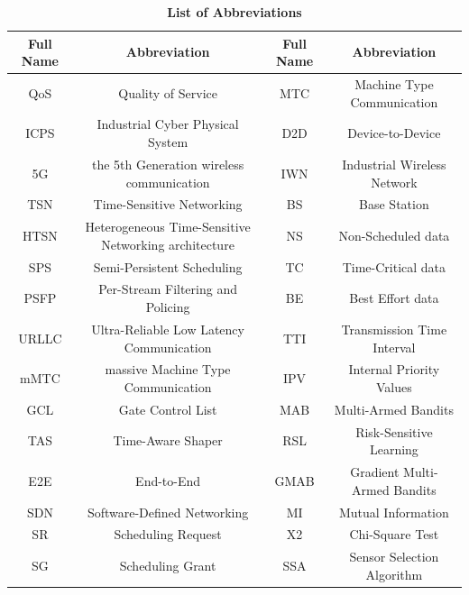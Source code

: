 \documentclass{SCIS2021}
\begin{document}
	
	\begin{table}[htbp]
		\footnotesize
		\captionsetup{labelformat=empty}
		\caption{{\color{blue}\textbf{List of Abbreviations}}}
		\label{tal:abbreviation}
		\label{tab0}
		\tabcolsep 8pt %
		\begin{tabular*}{\textwidth}{c|c|c|c}
			\toprule
			{\color{blue}\textbf{Full Name}} & {\color{blue}\textbf{Abbreviation}} & {\color{blue}\textbf{Full Name}} & {\color{blue}\textbf{Abbreviation}} \\\hline
			{\color{blue}QoS} & {\color{blue}Quality of Service} & {\color{blue}MTC} & {\color{blue}Machine Type Communication} \\
			{\color{blue}ICPS} & {\color{blue}Industrial Cyber Physical System} & {\color{blue}D2D} & {\color{blue}Device-to-Device} \\
			{\color{blue}5G} & {\color{blue}the 5th Generation wireless communication} & {\color{blue}IWN} & {\color{blue}Industrial Wireless Network}\\
			{\color{blue}TSN} & {\color{blue}Time-Sensitive Networking} & {\color{blue}BS} & {\color{blue}Base Station} \\
			{\color{blue}HTSN} & {\color{blue}Heterogeneous Time-Sensitive Networking architecture} & {\color{blue}NS} & {\color{blue}Non-Scheduled data} \\
			{\color{blue}SPS} & {\color{blue}Semi-Persistent Scheduling} & {\color{blue}TC} & {\color{blue}Time-Critical data} \\
			{\color{blue}PSFP} & {\color{blue}Per-Stream Filtering and Policing} & {\color{blue}BE} & {\color{blue}Best Effort data} \\
			{\color{blue}URLLC} & {\color{blue}Ultra-Reliable Low Latency Communication} & {\color{blue}TTI} & {\color{blue}Transmission Time Interval} \\
			{\color{blue}mMTC} & {\color{blue}massive Machine Type Communication} & {\color{blue}IPV} & {\color{blue}Internal Priority Values} \\
			{\color{blue}GCL} & {\color{blue}Gate Control List} & {\color{blue}MAB} & {\color{blue}Multi-Armed Bandits} \\
			{\color{blue}TAS} & {\color{blue}Time-Aware Shaper} & {\color{blue}RSL} & {\color{blue}Risk-Sensitive Learning} \\
			{\color{blue}E2E} & {\color{blue}End-to-End} & {\color{blue}GMAB} & {\color{blue}Gradient Multi-Armed Bandits} \\
			{\color{blue}SDN} & {\color{blue}Software-Defined Networking} & {\color{blue}MI} & {\color{blue}Mutual Information} \\
			{\color{blue}SR} & {\color{blue}Scheduling Request} & {\color{blue}X2} & {\color{blue}Chi-Square Test} \\
			{\color{blue}SG} & {\color{blue}Scheduling Grant} & {\color{blue}SSA} & {\color{blue}Sensor Selection Algorithm} \\
			\bottomrule
		\end{tabular*}
	\end{table}
	
\end{document}
